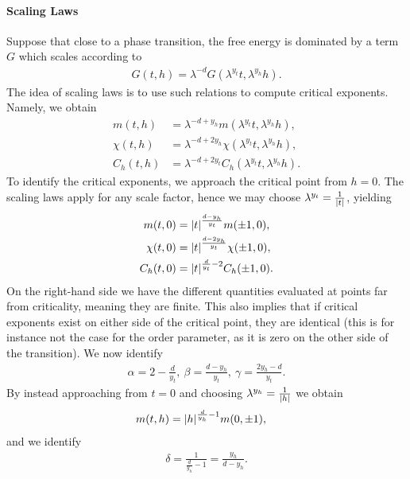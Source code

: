 \paragraph{Scaling Laws}
Suppose that close to a phase transition, the free energy is dominated by a term $G$ which scales according to
\begin{align*}
	G(t, h) = \lambda^{-d}G(\lambda^{y_{t}}t, \lambda^{y_{h}}h).
\end{align*}
The idea of scaling laws is to use such relations to compute critical exponents. Namely, we obtain
\begin{align*}
	m(t, h)     &= \lambda^{-d + y_{h}}m(\lambda^{y_{t}}t, \lambda^{y_{h}}h), \\
	\chi(t, h)  &= \lambda^{-d + 2y_{h}}\chi(\lambda^{y_{t}}t, \lambda^{y_{h}}h), \\
	C_{h}(t, h) &= \lambda^{-d + 2y_{t}}C_{h}(\lambda^{y_{t}}t, \lambda^{y_{h}}h).
\end{align*}
To identify the critical exponents, we approach the critical point from $h = 0$. The scaling laws apply for any scale factor, hence we may choose $\lambda^{y_{t}} = \frac{1}{\abs{t}}$, yielding
\begin{align*}
	m(t, 0)     &= \abs{t}^{\frac{d - y_{h}}{y_{t}}}m(\pm 1, 0), \\
	\chi(t, 0)  &= \abs{t}^{\frac{d - 2y_{h}}{y_{t}}}\chi(\pm 1, 0), \\
	C_{h}(t, 0) &= \abs{t}^{\frac{d}{y_{t}} - 2}C_{h}(\pm 1, 0).
\end{align*}
On the right-hand side we have the different quantities evaluated at points far from criticality, meaning they are finite. This also implies that if critical exponents exist on either side of the critical point, they are identical (this is for instance not the case for the order parameter, as it is zero on the other side of the transition). We now identify
\begin{align*}
	\alpha = 2 - \frac{d}{y_{t}},\ \beta = \frac{d - y_{h}}{y_{t}},\ \gamma = \frac{2y_{h} - d}{y_{t}}.
\end{align*}
By instead approaching from $t = 0$ and choosing $\lambda^{y_{h}} = \frac{1}{\abs{h}}$ we obtain
\begin{align*}
	m(t, h) &= \abs{h}^{\frac{d}{y_{h}} - 1}m(0, \pm 1),
\end{align*}
and we identify
\begin{align*}
	\delta= \frac{1}{\frac{d}{y_{h}} - 1} = \frac{y_{h}}{d - y_{h}}.
\end{align*}

